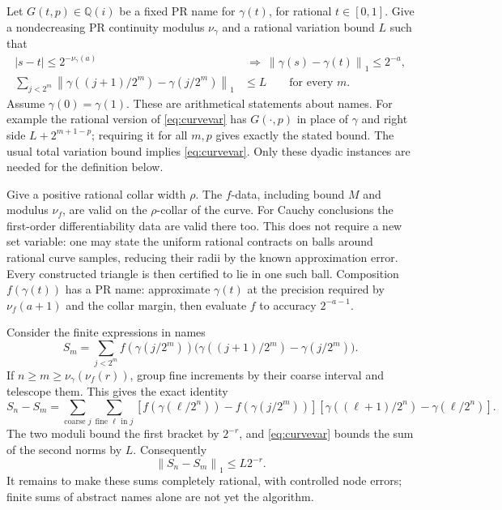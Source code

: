 \documentclass[11pt]{article}
\theoremstyle{definition}
\newcommand{\Q}{\mathbb Q}
\newcommand{\norm}[1]{\left\lVert#1\right\rVert_1}
\begin{document}
Let \(G(t,p)\in\Q(i)\) be a fixed PR name for \(\gamma(t)\), for rational
\(t\in[0,1]\). Give a nondecreasing PR continuity modulus \(\nu_\gamma\)
and a rational variation bound \(L\) such that
\begin{align}
 |s-t|\le2^{-\nu_\gamma(a)}&\ \Longrightarrow\
       \norm{\gamma(s)-\gamma(t)}\le2^{-a},\label{eq:curvemod}\\
 \sum_{j<2^m}\norm{\gamma((j+1)/2^m)-\gamma(j/2^m)}
       &\le L\qquad\text{for every }m.\label{eq:curvevar}
\end{align}
Assume \(\gamma(0)=\gamma(1)\). These are arithmetical statements about
names. For example the rational version of \eqref{eq:curvevar} has
\(G(\cdot,p)\) in place of \(\gamma\) and right side
\(L+2^{m+1-p}\); requiring it for all \(m,p\) gives exactly the stated
bound. The usual total variation bound implies \eqref{eq:curvevar}.
Only these dyadic instances are needed for the definition below.

Give a positive rational collar width \(\rho\). The \(f\)-data, including
bound \(M\) and modulus \(\nu_f\), are valid on the \(\rho\)-collar of
the curve. For Cauchy conclusions the first-order differentiability
data are valid there too. This does not require a new set variable:
one may state the uniform rational contracts on balls around rational
curve samples, reducing their radii by the known approximation error.
Every constructed triangle is then certified to lie in one such ball.
Composition \(f(\gamma(t))\) has a PR name: approximate \(\gamma(t)\)
at the precision required by \(\nu_f(a+1)\) and the collar margin, then
evaluate \(f\) to accuracy \(2^{-a-1}\).

Consider the finite expressions in names
\[
 S_m=\sum_{j<2^m}f(\gamma(j/2^m))
                 \bigl(\gamma((j+1)/2^m)-\gamma(j/2^m)\bigr).
\]
If \(n\ge m\ge\nu_\gamma(\nu_f(r))\), group fine increments by their
coarse interval and telescope them. This gives the exact identity
\[
 S_n-S_m=\sum_{\text{coarse }j}\sum_{\text{fine }\ell\text{ in }j}
 [f(\gamma(\ell/2^n))-f(\gamma(j/2^m))]
 [\gamma((\ell+1)/2^n)-\gamma(\ell/2^n)].
\]
The two moduli bound the first bracket by \(2^{-r}\), and
\eqref{eq:curvevar} bounds the sum of the second norms by \(L\).
Consequently
\begin{equation}\label{eq:stieltjesrefine}
 \norm{S_n-S_m}\le L2^{-r}.
\end{equation}
It remains to make these sums completely rational, with controlled node
errors; finite sums of abstract names alone are not yet the algorithm.
\end{document}
